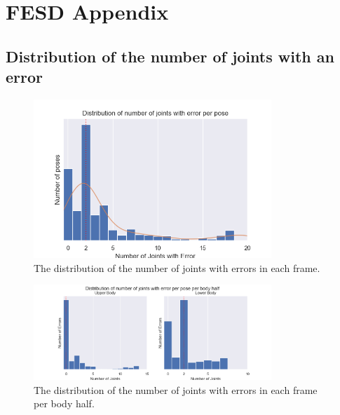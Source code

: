 \chapter{FESD Appendix}


\section{Distribution of the number of joints with an error}

\begin{figure}
  \centering
  \includegraphics[width=0.8\textwidth]{figures/Data/joint_errors_per_pose/distribution_of_joint_errors_per_pose.png}
  \caption[Number of Joints with error]{The distribution of the number of joints with errors in each frame.}
  \label{fig:dist_jt_epp}
\end{figure}

\begin{figure}
  \centering
  \includegraphics[width=0.8\textwidth]{figures/Data/joint_errors_per_pose/distribution_of_joint_errors_per_pose_per_body_half.png}
  \caption[Number of Joints with error per body half]{The distribution of the number of joints with errors in each frame per body half.}
  \label{fig:dist_bh_epp}
\end{figure}

